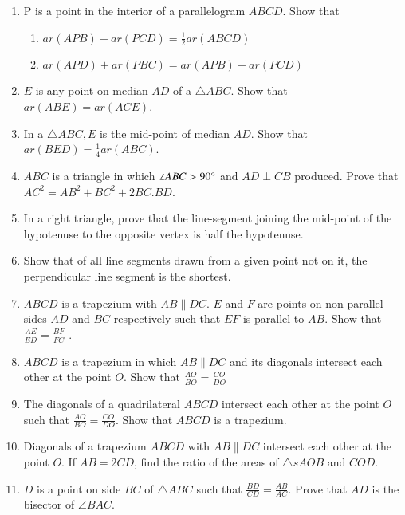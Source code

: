\begin{enumerate}[label=\thesubsection.\arabic*.,ref=\thesubsection.\theenumi]
\begin{figure}[H]
\end{figure}
\item P is a point in the interior of a parallelogram $ABCD$. Show that
\begin{enumerate}
\item $ar (APB) + ar (PCD) = \frac{1}{ 2}ar (ABCD)$
\item $ar (APD) + ar (PBC) = ar (APB) + ar (PCD)$
\end{enumerate}
%
\item $E$ is any point on median $AD$ of a  $\triangle  ABC$. Show that $ar (ABE) = ar (ACE)$.
\item  In a $\triangle ABC, E$ is the mid-point of median $AD$. Show that $ar (BED) = \frac{1}{ 4}ar(ABC)$.
%
\item  $ABC$ is a triangle in which  $\angle  ABC > 90\degree$ and $AD  \perp  CB$ produced. Prove that
$ AC^2= AB^2 + BC^2 + 2 BC . BD$.
\item In a right triangle, prove that the line-segment joining the mid-point of the hypotenuse to the opposite vertex is half the hypotenuse.
\item Show that of all line segments drawn from a given point not on it, the perpendicular line segment is the shortest.
\item $ABCD$ is a trapezium with $AB  \parallel  DC$. $E$ and $F$ are points on non-parallel sides $AD$ and $BC$ respectively such that $EF$ is parallel to $AB$. Show that
$\frac{AE}{ED}=\frac{ BF}{  FC}$ .
\item $ABCD$ is a trapezium in which $AB  \parallel  DC$ and its diagonals intersect each other at the point $O$. Show
that
$\frac{AO}{ BO}=\frac{CO}{  DO}$
\item The diagonals of a quadrilateral $ABCD$ intersect each other at the point $O$ such that $\frac{AO}{ BO}=\frac{CO}{  DO}$.   Show that $ABCD$ is a trapezium.
\item  Diagonals of a trapezium $ABCD$ with $AB  \parallel  DC$ intersect each other at the point $O$. If $AB = 2 CD$, find the ratio of the areas of $\triangle s AOB$ and $COD$.
\item   $D$ is a point on side $BC$ of  $\triangle  ABC$ such that
$\frac{BD}{CD}= \frac{AB}{AC}  $.  Prove that $AD$ is the bisector of  $\angle  BAC$.
\end{enumerate}

